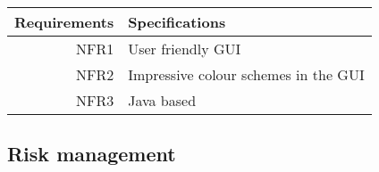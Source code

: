 \documentclass{article}
\begin{document}
\begin{tabular}{|r|l|}

\hline
Requirements & Specifications\\[5pt]
\hline
NFR1&
User friendly GUI
\\\hline

NFR2&
Impressive colour schemes in the GUI
\\\hline

NFR3&
Java based
\\\hline

\end{tabular}

\subsection{Risk management}
\label{sec:riskman}
\pagebreak





\end{document}
